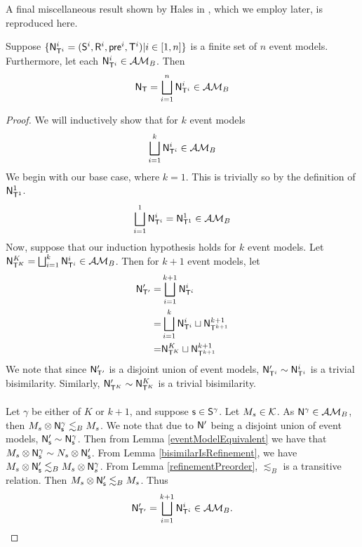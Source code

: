 A final miscellaneous result shown by Hales in \cite{hales13synthesis}, which we employ later, is reproduced here.

\begin{lemma} \label{brestrictDisjoint}
Suppose $\{ \mathrm{\mathsf{N}}^i_{\mathrm{\mathsf{T}}^i} = (\mathrm{\mathsf{S}}^i, \mathrm{\mathsf{R}}^i, \mathrm{\mathsf{pre}}^i, \mathrm{\mathsf{T}}^i) | i \in [1, n] \}$ is a finite set of $n$ event
models.
Furthermore, let each $\mathrm{\mathsf{N}}^i_{\mathrm{\mathsf{T}}^i} \in \mathcal{AM}_B$.
Then
\[
	\mathrm{\mathsf{N}}_\mathrm{\mathsf{T}} = \bigsqcup_{i = 1}^{n} \mathrm{\mathsf{N}}^i_{\mathrm{\mathsf{T}}^i} \in \mathcal{AM}_B
\]
\end{lemma}

\begin{proof}
We will inductively show that for $k$ event models
\[
	\bigsqcup_{i = 1}^k \mathrm{\mathsf{N}}^i_{\mathrm{\mathsf{T}}^i} \in \mathcal{AM}_B
\]
We begin with our base case, where $k = 1$.
This is trivially so by the definition of $\mathrm{\mathsf{N}}^1_{\mathrm{\mathsf{T}}^1}$.
\[
	\bigsqcup_{i = 1}^1 \mathrm{\mathsf{N}}^i_{\mathrm{\mathsf{T}}^i} = \mathrm{\mathsf{N}}^1_{\mathrm{\mathsf{T}}^1} \in \mathcal{AM}_B
\]
Now, suppose that our induction hypothesis holds for $k$ event models.
Let $\mathrm{\mathsf{N}}^K_{\mathrm{\mathsf{T}}^K} = \bigsqcup_{i = 1}^k \mathrm{\mathsf{N}}^i_{\mathrm{\mathsf{T}}^i} \in \mathcal{AM}_B$.
Then for $k+1$ event models, let
\begin{align*}
	\mathrm{\mathsf{N}}'_{\mathrm{\mathsf{T}}'} = & \bigsqcup_{i = 1}^{k+1} \mathrm{\mathsf{N}}^i_{\mathrm{\mathsf{T}}^i} \\
	= & \bigsqcup_{i = 1}^k \mathrm{\mathsf{N}}^i_{\mathrm{\mathsf{T}}^i} \sqcup \mathrm{\mathsf{N}}^{k+1}_{\mathrm{\mathsf{T}}^{k+1}} \\
	= & \mathrm{\mathsf{N}}^K_{\mathrm{\mathsf{T}}^K} \sqcup \mathrm{\mathsf{N}}^{k+1}_{\mathrm{\mathsf{T}}^{k+1}}
\end{align*}
We note that since $\mathrm{\mathsf{N}}'_{\mathrm{\mathsf{T}}'}$ is a disjoint union of event models, $\mathrm{\mathsf{N}}'_{\mathrm{\mathsf{T}}^i} \sim \mathrm{\mathsf{N}}^i_{\mathrm{\mathsf{T}}^i}$ is a
trivial bisimilarity.
Similarly, $\mathrm{\mathsf{N}}'_{\mathrm{\mathsf{T}}^K} \sim \mathrm{\mathsf{N}}^K_{\mathrm{\mathsf{T}}^K}$ is a trivial bisimilarity.\\
\\
Let $\gamma$ be either of $K$ or $k+1$, and suppose $\mathrm{\mathsf{s}} \in \mathrm{\mathsf{S}}^\gamma$.
Let $M_s \in \mathcal{K}$.
As $\mathrm{\mathsf{N}}^\gamma \in \mathcal{AM}_B$, then $M_s \otimes \mathrm{\mathsf{N}}^\gamma_\mathrm{\mathsf{s}} \lesssim_B M_s$.
We note that due to $\mathrm{\mathsf{N}}'$ being a disjoint union of event models, $\mathrm{\mathsf{N}}'_\mathrm{\mathsf{s}} \sim \mathrm{\mathsf{N}}^\gamma_\mathrm{\mathsf{s}}$.
Then from Lemma \ref{eventModelEquivalent} we have that $M_s \otimes \mathrm{\mathsf{N}}^\gamma_\mathrm{\mathsf{s}} \sim N_s
\otimes \mathrm{\mathsf{N}}'_\mathrm{\mathsf{s}}$.
From Lemma \ref{bisimilarIsRefinement}, we have $M_s \otimes \mathrm{\mathsf{N}}'_\mathrm{\mathsf{s}} \lesssim_B M_s
\otimes \mathrm{\mathsf{N}}^\gamma_s$.
From Lemma \ref{refinementPreorder}, $\lesssim_B$ is a transitive relation.
Then $M_s \otimes \mathrm{\mathsf{N}}'_\mathrm{\mathsf{s}} \lesssim_B M_s$.
Thus
\[
\mathrm{\mathsf{N}}'_{\mathrm{\mathsf{T}}'} = \bigsqcup_{i = 1}^{k+1} \mathrm{\mathsf{N}}^i_{\mathrm{\mathsf{T}}^i} \in \mathcal{AM}_B.
\]
\end{proof}

